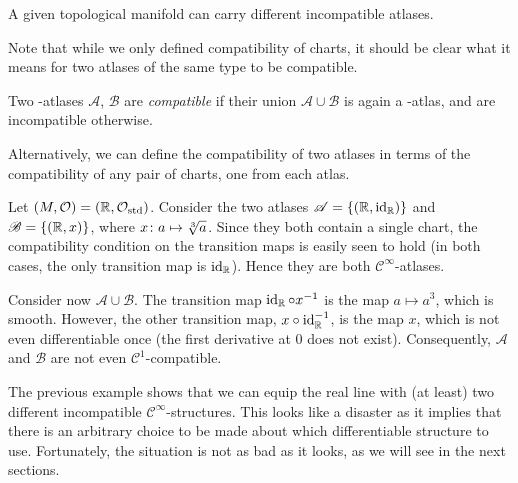 \br 
A given topological manifold can carry different incompatible atlases.
\er

Note that while we only defined compatibility of charts, it should be clear what it means for two atlases of the same type to be compatible.

\bd
Two {\scalebox{0.75}\FiveFlowerOpen}-atlases $\mathscr{A}$, $\mathscr{B}$ are \emph{compatible} if their union $\mathscr{A}\cup\mathscr{B}$ is again a {\scalebox{0.75}\FiveFlowerOpen}-atlas, and are incompatible otherwise.
\ed

Alternatively, we can define the compatibility of two atlases in terms of the compatibility of any pair of charts, one from each atlas.

\be
Let $(M,\mathcal{O})=(\mathbb{R},\mathcal{O}_\mathrm{std})$. Consider the two atlases $\mathscr{A}=\{(\mathbb{R},\operatorname{id}_{\mathbb{R}})\}$ and $\mathscr{B}=\{(\mathbb{R},x)\}$, where $x\colon a \mapsto \sqrt[3]{a}$. Since they both contain a single chart, the compatibility condition on the transition maps is easily seen to hold (in both cases, the only transition map is $\operatorname{id}_{\mathbb{R}}$). Hence they are both $\mathcal{C}^\infty$-atlases.

Consider now $\mathscr{A}\cup\mathscr{B}$. The transition map $\operatorname{id}_{\mathbb{R}}\circ x^{-1}$ is the map $a\mapsto a^3$, which is smooth. However, the other transition map, $x\circ\operatorname{id}_{\mathbb{R}}^{-1}$, is the map $x$, which is not even differentiable once (the first derivative at $0$ does not exist). Consequently, $\mathscr{A}$ and $\mathscr{B}$ are not even $\mathcal{C}^1$-compatible.
\ee

The previous example shows that we can equip the real line with (at least) two different incompatible $\mathcal{C}^\infty$-structures. This looks like a disaster as it implies that there is an arbitrary choice to be made about which differentiable structure to use. Fortunately, the situation is not as bad as it looks, as we will see in the next sections.

